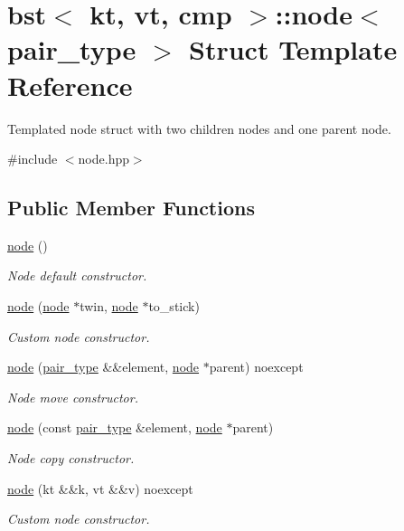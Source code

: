 \hypertarget{structbst_1_1node}{}\section{bst$<$ kt, vt, cmp $>$\+:\+:node$<$ pair\+\_\+type $>$ Struct Template Reference}
\label{structbst_1_1node}


Templated node struct with two children nodes and one parent node.  




{\ttfamily \#include $<$node.\+hpp$>$}

\subsection*{Public Member Functions}
\begin{DoxyCompactItemize}
\item 
\hyperlink{structbst_1_1node_a79aa79c3ff256126de5fdc848ec88b45}{node} ()
\begin{DoxyCompactList}\small\item\em Node default constructor. \end{DoxyCompactList}\item 
\hyperlink{structbst_1_1node_a87b48a3770bbaa16830f8bbb635edd38}{node} (\hyperlink{structbst_1_1node}{node} $\ast$twin, \hyperlink{structbst_1_1node}{node} $\ast$to\+\_\+stick)
\begin{DoxyCompactList}\small\item\em Custom node constructor. \end{DoxyCompactList}\item 
\hyperlink{structbst_1_1node_afb49ebb92c139b1a3fdaf71048b0dc1a}{node} (\hyperlink{classbst_a7b11cca2a3b4394915600194f741ab16}{pair\+\_\+type} \&\&element, \hyperlink{structbst_1_1node}{node} $\ast$parent) noexcept
\begin{DoxyCompactList}\small\item\em Node move constructor. \end{DoxyCompactList}\item 
\hyperlink{structbst_1_1node_a9970c480ef885a64710303bc9e3e6558}{node} (const \hyperlink{classbst_a7b11cca2a3b4394915600194f741ab16}{pair\+\_\+type} \&element, \hyperlink{structbst_1_1node}{node} $\ast$parent)
\begin{DoxyCompactList}\small\item\em Node copy constructor. \end{DoxyCompactList}\item 
\hyperlink{structbst_1_1node_a16fb9a6092d387f08864f4c75ca312bb}{node} (kt \&\&k, vt \&\&v) noexcept
\begin{DoxyCompactList}\small\item\em Custom node constructor. \end{DoxyCompactList}\end{DoxyCompactItemize}
